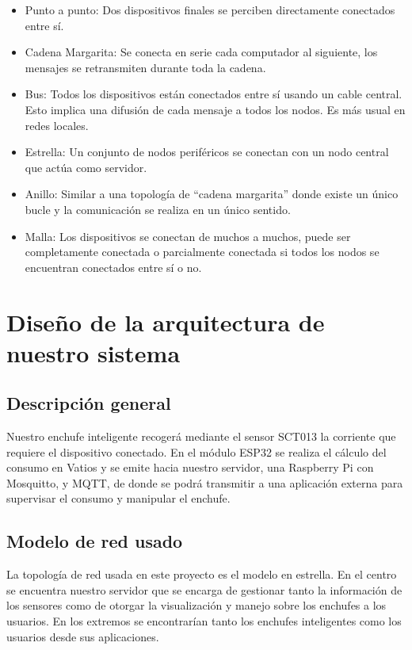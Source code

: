 \documentclass[a4paper,10pt]{article}
\begin{document}
\begin{itemize}
\item{Punto a punto: Dos dispositivos finales se perciben directamente
  conectados entre sí.}
\item{Cadena Margarita: Se conecta en serie cada computador al
  siguiente, los mensajes se retransmiten durante toda la cadena.}
\item{Bus: Todos los dispositivos están conectados entre sí usando
  un cable central. Esto implica una difusión de cada mensaje a
  todos los nodos. Es más usual en redes locales.}
\item{Estrella: Un conjunto de nodos periféricos se conectan con un
  nodo central que actúa como servidor.}
\item{Anillo: Similar a una topología de “cadena margarita” donde
  existe un único bucle y la comunicación se realiza en un único
  sentido.}
\item{Malla: Los dispositivos se conectan de muchos a muchos, puede
  ser completamente conectada o parcialmente conectada si todos los
  nodos se encuentran conectados entre sí o no.}
\end{itemize}

\newpage

\section{Diseño de la arquitectura de nuestro
sistema}\label{diseuxf1o-de-la-arquitectura-de-nuestro-sistema}

\subsection{Descripción general}\label{descripciuxf3n-general}

Nuestro enchufe inteligente recogerá mediante el sensor SCT013 la
corriente que requiere el dispositivo conectado. En el módulo ESP32 se
realiza el cálculo del consumo en Vatios y se emite hacia nuestro
servidor, una Raspberry Pi con Mosquitto, y MQTT, de donde se podrá
transmitir a una aplicación externa para supervisar el consumo y
manipular el enchufe.

\subsection{Modelo de red usado}\label{modelo-de-red-usado}

La topología de red usada en este proyecto es el modelo en
estrella. En el centro se encuentra nuestro servidor que se encarga de
gestionar tanto la información de los sensores como de otorgar la
visualización y manejo sobre los enchufes a los usuarios. En los
extremos se encontrarían tanto los enchufes inteligentes como los
usuarios desde sus aplicaciones.
\end{document}
